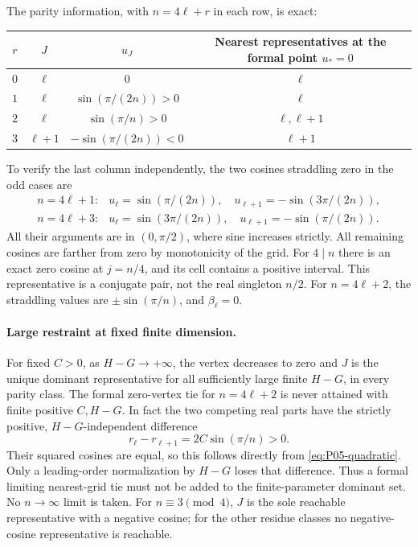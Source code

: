 The parity information, with $n=4\ell+r$ in each row, is exact:
\begin{center}
\renewcommand{\arraystretch}{1.2}
\begin{tabular}{@{}c c c c@{}}
\toprule
$r$ & $J$ & $u_J$ & Nearest representatives at the formal point $u_*=0$\\
\midrule
$0$ & $\ell$ & $0$ & $\ell$\\
$1$ & $\ell$ & $\sin(\pi/(2n))>0$ & $\ell$\\
$2$ & $\ell$ & $\sin(\pi/n)>0$ & $\ell,\ell+1$\\
$3$ & $\ell+1$ & $-\sin(\pi/(2n))<0$ & $\ell+1$\\
\bottomrule
\end{tabular}
\end{center}
To verify the last column independently, the two cosines straddling zero
in the odd cases are
\[
 \begin{array}{ll}
 n=4\ell+1:&u_\ell=\sin(\pi/(2n)),\quad
             u_{\ell+1}=-\sin(3\pi/(2n)),\\
 n=4\ell+3:&u_\ell=\sin(3\pi/(2n)),\quad
             u_{\ell+1}=-\sin(\pi/(2n)).
 \end{array}
\]
All their arguments are in $(0,\pi/2)$, where sine increases strictly.
All remaining cosines are farther from zero by monotonicity of the grid.
For $4\mid n$ there is an exact zero cosine at $j=n/4$, and its cell
contains a positive interval. This representative is a conjugate pair,
not the real singleton $n/2$. For $n=4\ell+2$, the straddling values
are $\pm\sin(\pi/n)$, and $\beta_\ell=0$.

\paragraph{Large restraint at fixed finite dimension.}
For fixed $C>0$, as $H-G\to+\infty$, the vertex decreases to zero
and $J$ is the unique dominant representative for all sufficiently large
finite $H-G$, in every parity class. The formal zero-vertex tie for
$n=4\ell+2$ is never attained with finite positive $C,H-G$.
In fact the two competing real parts have the strictly positive,
$H-G$-independent difference
\[
 r_\ell-r_{\ell+1}=2C\sin(\pi/n)>0.
\]
Their squared cosines are equal, so this follows directly from
\eqref{eq:P05-quadratic}. Only a leading-order normalization by $H-G$
loses that difference. Thus a formal limiting nearest-grid tie must not
be added to the finite-parameter dominant set. No $n\to\infty$ limit is taken.
For $n\equiv3\pmod4$, $J$ is the sole reachable representative with a
negative cosine; for the other residue classes no negative-cosine
representative is reachable.

